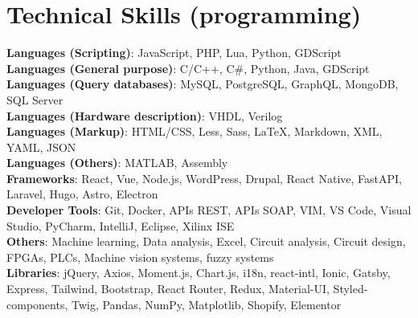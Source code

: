 \documentclass[letterpaper,11pt]{article}
\begin{document}
\section{Technical Skills (programming)}
 \begin{itemize}[leftmargin=0.15in, label={}]
    \small{\item{
     \textbf{Languages (Scripting)}{: JavaScript, PHP, Lua, Python, GDScript} \\
     \textbf{Languages (General purpose)}{: C/C++, C\#, Python, Java, GDScript} \\
     \textbf{Languages (Query databases)}{: MySQL, PostgreSQL, GraphQL, MongoDB, SQL Server} \\
     \textbf{Languages (Hardware description)}{: VHDL, Verilog} \\
     \textbf{Languages (Markup)}{: HTML/CSS, Less, Sass, LaTeX, Markdown, XML, YAML, JSON} \\
     \textbf{Languages (Others)}{: MATLAB, Assembly} \\
     \textbf{Frameworks}{: React, Vue, Node.js, WordPress, Drupal, React Native, FastAPI, Laravel, Hugo, Astro, Electron} \\
     \textbf{Developer Tools}{: Git, Docker, APIs REST, APIs SOAP, VIM, VS Code, Visual Studio, PyCharm, IntelliJ, Eclipse, Xilinx ISE} \\
     \textbf{Others}{: Machine learning, Data analysis, Excel, Circuit analysis, Circuit design, FPGAs, PLCs, Machine vision systems, fuzzy systems} \\
     \textbf{Libraries}{: jQuery, Axios, Moment.js, Chart.js, i18n, react-intl, Ionic, Gatsby, Express, Tailwind, Bootstrap, React Router, Redux, Material-UI, Styled-components, Twig, Pandas, NumPy, Matplotlib, Shopify, Elementor}
    }}
 \end{itemize}

\end{document}
